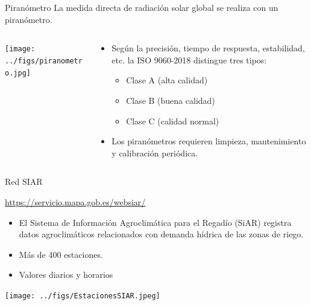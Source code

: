 \documentclass[aspectratio=169, usenames,svgnames,dvipsnames]{beamer}
\begin{document}
\begin{frame}[label={sec:orgf0b983f}]{Piranómetro}
La medida directa de radiación solar global se realiza con un piranómetro.
\begin{columns}
\begin{column}{0.4\columnwidth}
\begin{center}
\begin{center}
\texttt{[image: ../figs/piranometro.jpg]}
\end{center}
\end{center}
\end{column}
\begin{column}{0.6\columnwidth}
\begin{itemize}
\item Según la precisión, tiempo de respuesta, estabilidad, etc. la ISO 9060-2018 distingue tres tipos:
\begin{itemize}
\item Clase A (alta calidad)
\item Clase B (buena calidad)
\item Clase C (calidad normal)
\end{itemize}
\item Los piranómetros requieren limpieza, mantenimiento y calibración periódica.
\end{itemize}
\end{column}
\end{columns}
\end{frame}



\begin{frame}[label={sec:orgc5390db}]{Red SIAR}
\begin{block}{\url{https://servicio.mapa.gob.es/websiar/}}
\begin{itemize}
\item El Sistema de Información Agroclimática para el Regadío (SiAR)
registra datos agroclimáticos relacionados con demanda hídrica de
las zonas de riego.

\item Más de 400 estaciones.

\item Valores diarios y horarios
\end{itemize}

\begin{center}
\begin{center}
\texttt{[image: ../figs/EstacionesSIAR.jpeg]}
\end{center}
\end{center}
\end{block}
\end{frame}
\end{document}
